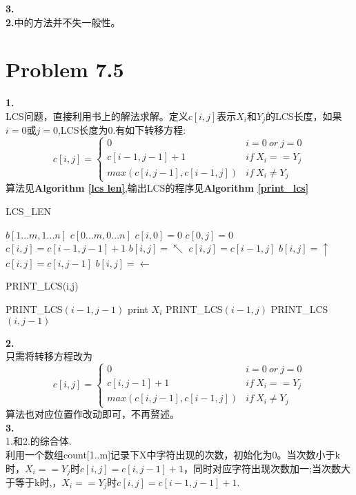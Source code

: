 \documentclass[onecolumn]{ctexart}
\begin{document}
\noindent \textbf{3.}\\
\indent \textbf{2.}中的方法并不失一般性。\\
\section*{Problem 7.5}
\noindent \textbf{1.}\\
\indent LCS问题，直接利用书上的解法求解。定义$c[i,j]$表示$X_i$和$Y_j$的LCS长度，如果$i=0$或$j=0$,LCS长度为0.有如下转移方程:
\[
	c[i,j]=
	\begin{cases}
	0&i=0\ or\ j=0\\
	c[i-1,j-1]+1 &if\ X_i==Y_j\\
	max(c[i,j-1],c[i-1,j]) &if\ X_i\neq Y_j
	\end{cases}
\]
算法见\textbf{Algorithm \ref{lcs len}},输出LCS的程序见\textbf{Algorithm \ref{print_lcs}}
\begin{algorithm}[htbp]
	\caption{LCS\_LEN}
	\label{lcs len}
	\begin{algorithmic}[1]
	\STATE $b[1...m,1...n]$
	\STATE $c[0...m,0...n]$
	 	\STATE $c[i,0]=0$
	\ENDFOR
		\STATE $c[0,j]=0$
	\ENDFOR	
			\STATE $c[i,j]=c[i-1,j-1]+1$
			\STATE $b[i,j]=\nwarrow$
			\STATE $c[i,j]=c[i-1,j]$
			\STATE $b[i,j]=\uparrow$
		\ELSE
			\STATE $c[i,j]=c[i,j-1]$
			\STATE $b[i,j]=\leftarrow$
		\ENDIF
		\ENDFOR
	\ENDFOR
	\end{algorithmic}
\end{algorithm}

\begin{algorithm}[htbp]
	\caption{PRINT\_LCS(i,j)}
	\label{print_lcs}
	\begin{algorithmic}[1]
			\RETURN { }
		\ENDIF
			\STATE PRINT\_LCS$(i-1,j-1)$
			\STATE print $X_i$
			\STATE PRINT\_LCS$(i-1,j)$
		\ELSE
			\STATE PRINT\_LCS$(i,j-1)$
		\ENDIF
	\end{algorithmic}
\end{algorithm}


\noindent \textbf{2.}\\
	\indent 只需将转移方程改为\\
	\[
	c[i,j]=
	\begin{cases}
	0&i=0\ or\ j=0\\
	c[i,j-1]+1 &if\ X_i==Y_j\\
	max(c[i,j-1],c[i-1,j]) &if\ X_i\neq Y_j
	\end{cases}
	\] 
	算法也对应位置作改动即可，不再赘述。\\
\noindent \textbf{3.}\\
\indent 1.和2.的综合体.\\
\indent 利用一个数组count[1..m]记录下X中字符出现的次数，初始化为0。当次数小于k时，$X_i==Y_j$时$c[i,j]=c[i,j-1]+1$，同时对应字符出现次数加一;当次数大于等于k时,，$X_i==Y_j$时$c[i,j]=c[i-1,j-1]+1$.\\
\end{document}
